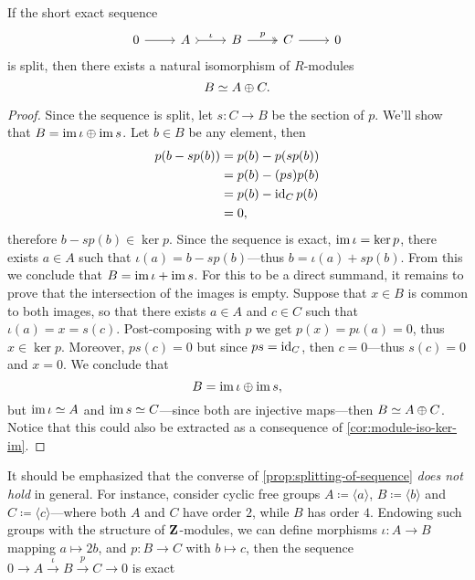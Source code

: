 \begin{proposition}
\label{prop:splitting-of-sequence}
If the short exact sequence
\[
\begin{tikzcd}
0 \ar[r] &A \ar[r, tail, "\iota"] &B \ar[r, two heads, "p"] &C \ar[r] &0
\end{tikzcd}
\]
is split, then there exists a natural isomorphism of \(R\)-modules
\[
B \simeq A \oplus C.
\]
\end{proposition}

\begin{proof}
Since the sequence is split, let \(s: C \to B\) be the section of \(p\). We'll
show that \(B = \operatorname{im} \iota \oplus \operatorname{im} s\). Let \(b \in B\) be any element, then
\begin{align*}
  p(b - sp(b))
  &= p(b) - p (s p(b)) \\
  &= p(b) - (p s) p(b) \\
  &= p(b) - \operatorname{id}_C p(b) \\
  &= 0,
\end{align*}
therefore \(b - s p(b) \in \ker p\). Since the sequence is exact,
\(\operatorname{im} \iota = \ker p\), there exists \(a \in A\) such that
\(\iota(a) = b - s p(b)\)---thus \(b = \iota(a) + s p(b)\). From this we
conclude that \(B = \operatorname{im} \iota + \operatorname{im} s\). For this to be a direct summand, it
remains to prove that the intersection of the images is empty. Suppose that
\(x \in B\) is common to both images, so that there exists \(a \in A\) and
\(c \in C\) such that \(\iota(a) = x = s(c)\). Post-composing with \(p\) we get
\(p(x) = p \iota(a) = 0\), thus \(x \in \ker p\). Moreover, \(p s(c) = 0\) but
since \(p s = \operatorname{id}_C\), then \(c = 0\)---thus \(s(c) = 0\) and \(x = 0\). We
conclude that
\[
B = \operatorname{im} \iota \oplus \operatorname{im} s,
\]
but \(\operatorname{im} \iota \simeq A\) and \(\operatorname{im} s \simeq C\)---since both are injective
maps---then \(B \simeq A \oplus C\). Notice that this could also be extracted as a
consequence of \cref{cor:module-iso-ker-im}.
\end{proof}

\begin{remark}
\label{rem:converse-of-splitting-sequence-is-false}
It should be emphasized that the converse of \cref{prop:splitting-of-sequence}
\emph{does not hold} in general. For instance, consider cyclic free groups
\(A \coloneq \langle a \rangle\), \(B \coloneq \langle b \rangle\) and
\(C \coloneq \langle c \rangle\)---where both \(A\) and \(C\) have order \(2\),
while \(B\) has order \(4\). Endowing such groups with the structure of
\(\mathbf{Z}\)-modules, we can define morphisms \(\iota: A \to B\) mapping
\(a \mapsto 2 b\), and \(p: B \to C\) with \(b \mapsto c\), then the sequence
\(0 \to A \xrightarrow \iota B \xrightarrow p C \to 0\) is exact

\end{remark}

